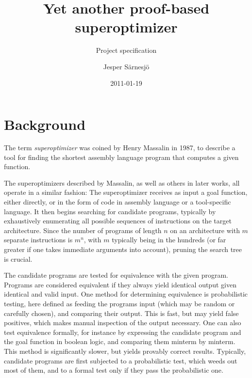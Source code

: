 \documentclass[a4paper,11pt]{kth-mag}
\title{Yet another proof-based superoptimizer}
\subtitle{Project specification}
\author{Jesper Särnesjö}
\date{2011-01-19}
\begin{document}
\frontmatter

\pagestyle{empty}

\removepagenumbers

\maketitle


\mainmatter

\pagestyle{newchap}

\section*{Background}

The term \emph{superoptimizer} was coined by Henry Massalin in 1987, to describe a tool for finding the shortest assembly language program that computes a given function.

The superoptimizers described by Massalin, as well as others in later works, all operate in a similar fashion:
The superoptimizer receives as input a goal function, either directly, or in the form of code in assembly language or a tool-specific language.
It then begins searching for candidate programs, typically by exhaustively enumerating all possible sequences of instructions on the target architecture.
Since the number of programs of length $n$ on an architecture with $m$ separate instructions is $m^n$, with $m$ typically being in the hundreds (or far greater if one takes immediate arguments into account), pruning the search tree is crucial.

The candidate programs are tested for equivalence with the given program.
Programs are considered equivalent if they always yield identical output given identical and valid input.
One method for determining equivalence is probabilistic testing, here defined as feeding the programs input (which may be random or carefully chosen), and comparing their output.
This is fast, but may yield false positives, which makes manual inspection of the output necessary.
One can also test equivalence formally, for instance by expressing the candidate program and the goal function in boolean logic, and comparing them minterm by minterm.
This method is significantly slower, but yields provably correct results.
Typically, candidate programs are first subjected to a probabilistic test, which weeds out most of them, and to a formal test only if they pass the probabilistic one.
\end{document}
